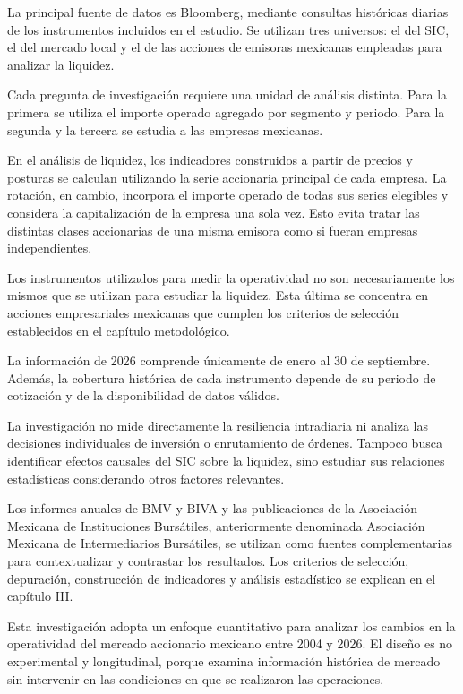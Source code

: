 La principal fuente de datos es Bloomberg, mediante consultas históricas diarias de los instrumentos incluidos en el estudio. Se utilizan tres universos: el del SIC, el del mercado local y el de las acciones de emisoras mexicanas empleadas para analizar la liquidez.

Cada pregunta de investigación requiere una unidad de análisis distinta. Para la primera se utiliza el importe operado agregado por segmento y periodo. Para la segunda y la tercera se estudia a las empresas mexicanas.

En el análisis de liquidez, los indicadores construidos a partir de precios y posturas se calculan utilizando la serie accionaria principal de cada empresa. La rotación, en cambio, incorpora el importe operado de todas sus series elegibles y considera la capitalización de la empresa una sola vez. Esto evita tratar las distintas clases accionarias de una misma emisora como si fueran empresas independientes.

Los instrumentos utilizados para medir la operatividad no son necesariamente los mismos que se utilizan para estudiar la liquidez. Esta última se concentra en acciones empresariales mexicanas que cumplen los criterios de selección establecidos en el capítulo metodológico.

La información de 2026 comprende únicamente de enero al 30 de septiembre. Además, la cobertura histórica de cada instrumento depende de su periodo de cotización y de la disponibilidad de datos válidos.

La investigación no mide directamente la resiliencia intradiaria ni analiza las decisiones individuales de inversión o enrutamiento de órdenes. Tampoco busca identificar efectos causales del SIC sobre la liquidez, sino estudiar sus relaciones estadísticas considerando otros factores relevantes.

Los informes anuales de BMV y BIVA y las publicaciones de la Asociación Mexicana de Instituciones Bursátiles, anteriormente denominada Asociación Mexicana de Intermediarios Bursátiles, se utilizan como fuentes complementarias para contextualizar y contrastar los resultados. Los criterios de selección, depuración, construcción de indicadores y análisis estadístico se explican en el capítulo III.



Esta investigación adopta un enfoque cuantitativo para analizar los cambios en la operatividad del mercado accionario mexicano entre 2004 y 2026. El diseño es no experimental y longitudinal, porque examina información histórica de mercado sin intervenir en las condiciones en que se realizaron las operaciones.

